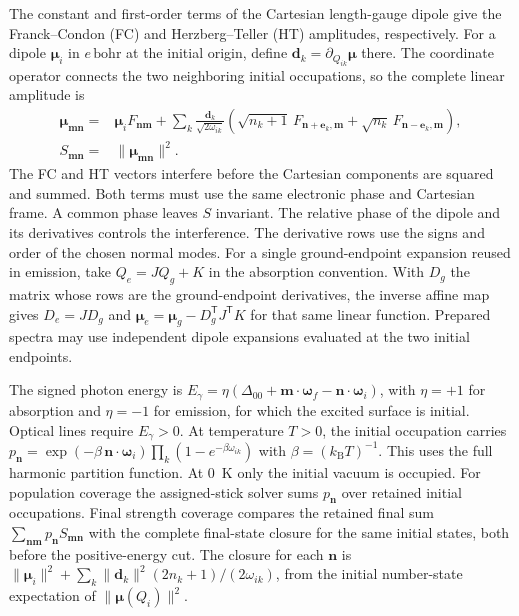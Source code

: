 The constant and first-order terms of the Cartesian length-gauge
dipole give the Franck--Condon (FC) and Herzberg--Teller (HT) amplitudes,
respectively. For a dipole $\boldsymbol\mu_i$ in $e\,\mathrm{bohr}$ at the
initial origin, define $\mathbf d_k=\partial_{Q_{ik}}\boldsymbol\mu$ there.
The coordinate operator connects the two neighboring initial occupations,
so the complete linear amplitude is
\begin{equation}
 \begin{aligned}
 \boldsymbol\mu_{\mathbf m\mathbf n}={}&
 \boldsymbol\mu_i F_{\mathbf n\mathbf m}
 +\sum_k \frac{\mathbf d_k}{\sqrt{2\omega_{ik}}}
 \left(\sqrt{n_k+1}\, F_{\mathbf n+\mathbf e_k,\mathbf m}
       +\sqrt{n_k}\, F_{\mathbf n-\mathbf e_k,\mathbf m}\right),\\
 S_{\mathbf m\mathbf n}={}&\|\boldsymbol\mu_{\mathbf m\mathbf n}\|^2 .
 \end{aligned}
 \label{eq:strength}
\end{equation}
The FC and HT vectors interfere before the Cartesian components are
squared and summed. Both terms must use the same electronic phase and
Cartesian frame. A common phase leaves $S$ invariant. The relative
phase of the dipole and its derivatives controls the interference.
The derivative rows use the signs and order of the chosen normal modes.
For a single ground-endpoint expansion reused in emission, take
$Q_e=JQ_g+K$ in the absorption convention. With $D_g$ the matrix whose rows
are the ground-endpoint derivatives, the inverse affine map gives
$D_e=JD_g$ and $\boldsymbol\mu_e=\boldsymbol\mu_g-D_g^{\mathsf T}J^{\mathsf T}K$
for that same linear function. Prepared spectra may use independent dipole
expansions evaluated at the two initial endpoints.\cite{baiardi}

The signed photon energy is $E_\gamma=\eta(\Delta_{00}+
\mathbf m\cdot\boldsymbol\omega_f-\mathbf n\cdot\boldsymbol\omega_i)$,
with $\eta=+1$ for absorption and $\eta=-1$ for emission, for which
the excited surface is initial. Optical lines require $E_\gamma>0$.
At temperature $T>0$, the initial occupation carries
$p_{\mathbf n}=\exp(-\beta\,\mathbf n\cdot\boldsymbol\omega_i)
\prod_k(1-e^{-\beta\omega_{ik}})$ with $\beta=(k_{\mathrm B}T)^{-1}$.
This uses the full harmonic partition function. At 0~K only the initial
vacuum is occupied. For population coverage the assigned-stick solver
sums $p_{\mathbf n}$ over retained initial occupations. Final strength
coverage compares the retained final sum $\sum_{\mathbf n\mathbf m}
p_{\mathbf n}S_{\mathbf m\mathbf n}$ with the complete final-state closure
for the same initial states, both before the positive-energy cut. The
closure for each $\mathbf n$ is
$\|\boldsymbol\mu_i\|^2+\sum_k\|\mathbf d_k\|^2(2n_k+1)/(2\omega_{ik})$,
from the initial number-state expectation of $\|\boldsymbol\mu(Q_i)\|^2$.

